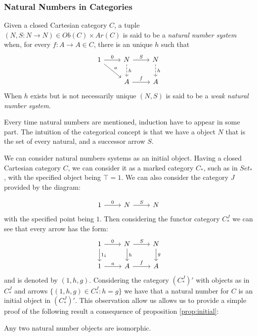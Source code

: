 \subsubsection{Natural Numbers in Categories}


\begin{definition}
  Given a closed Cartesian category $C$, a tuple  $(N,S:N\to N)\in Ob(C)\times Ar(C)$ is said to be a \emph{natural number system} when, for every $f:A\to A\in C$, there is an unique $h$ such that
  \[
    \begin{tikzcd}
      1\arrow{dr}{a}\arrow{r}{0} & N\arrow{r}{S}\arrow[dashed]{d}{h} & N\arrow[dashed]{d}{h}\\
      & A\arrow{r}{f} & A
    \end{tikzcd}
  \]
  When $h$ exists but is not necessarily unique $(N,S)$ is said to be a \emph{weak natural number system}.
\end{definition}
Every time natural numbers are mentioned, induction have to appear in some part. The intuition of the categorical concept is that we have a object $N$ that is the set of every natural, and a successor arrow $S$.

We can consider natural numbers systems as an initial object. Having a closed Cartesian category $C$, we can consider it as a marked category $C_*$, such as in $Set_*$, with the specified object being $\top =1$. We can also consider the category $J$ provided by the diagram:

\[
  \begin{tikzcd}
    1\arrow{r}{0} & N\arrow{r}{S} & N
  \end{tikzcd}
\]
with the specified point being $1$. Then considering the functor category $C_*^J$ we can see that every arrow has the form: 
\[
  \begin{tikzcd}
    1\arrow{r}{0}\arrow{d}{1_1} & N\arrow{r}{S}\arrow{d}{h} & N\arrow{d}{g}\\
    1\arrow{r}{a} & A\arrow{r}{f} & A
  \end{tikzcd}
\]
and is denoted by $(1,h,g)$. Considering the category $(C_*^J)'$ with objects as in $C_*^J$ and arrows  $\{(1,h,g)\in C_*^J: h=g\}$ we have that a natural number for $C$ is an initial object in $(C_*^J)'$. This observation allow us allows us to provide a simple proof of the following result a consequence of proposition \ref{prop:initial}:

\begin{proposition}
  Any two natural number objects are isomorphic.
\end{proposition}




